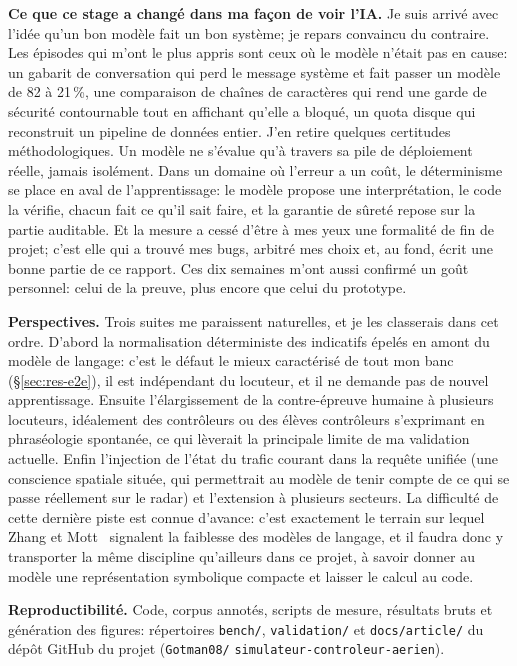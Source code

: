 \documentclass[11pt,a4paper]{article}
\begin{document}
\medskip
\noindent\textbf{Ce que ce stage a changé dans ma façon de voir l'IA.} Je suis arrivé avec l'idée qu'un bon modèle fait un bon système; je repars convaincu du contraire. Les épisodes qui m'ont le plus appris sont ceux où le modèle n'était pas en cause: un gabarit de conversation qui perd le message système et fait passer un modèle de 82 à 21\,\%, une comparaison de chaînes de caractères qui rend une garde de sécurité contournable tout en affichant qu'elle a bloqué, un quota disque qui reconstruit un pipeline de données entier. J'en retire quelques certitudes méthodologiques. Un modèle ne s'évalue qu'à travers sa pile de déploiement réelle, jamais isolément. Dans un domaine où l'erreur a un coût, le déterminisme se place en aval de l'apprentissage: le modèle propose une interprétation, le code la vérifie, chacun fait ce qu'il sait faire, et la garantie de sûreté repose sur la partie auditable. Et la mesure a cessé d'être à mes yeux une formalité de fin de projet; c'est elle qui a trouvé mes bugs, arbitré mes choix et, au fond, écrit une bonne partie de ce rapport. Ces dix semaines m'ont aussi confirmé un goût personnel: celui de la preuve, plus encore que celui du prototype.

\medskip
\noindent\textbf{Perspectives.} Trois suites me paraissent naturelles, et je les classerais dans cet ordre. D'abord la normalisation déterministe des indicatifs épelés en amont du modèle de langage: c'est le défaut le mieux caractérisé de tout mon banc (\S\ref{sec:res-e2e}), il est indépendant du locuteur, et il ne demande pas de nouvel apprentissage. Ensuite l'élargissement de la contre-épreuve humaine à plusieurs locuteurs, idéalement des contrôleurs ou des élèves contrôleurs s'exprimant en phraséologie spontanée, ce qui lèverait la principale limite de ma validation actuelle. Enfin l'injection de l'état du trafic courant dans la requête unifiée (une conscience spatiale située, qui permettrait au modèle de tenir compte de ce qui se passe réellement sur le radar) et l'extension à plusieurs secteurs. La difficulté de cette dernière piste est connue d'avance: c'est exactement le terrain sur lequel Zhang et Mott~\cite{zhang} signalent la faiblesse des modèles de langage, et il faudra donc y transporter la même discipline qu'ailleurs dans ce projet, à savoir donner au modèle une représentation symbolique compacte et laisser le calcul au code. 

\medskip
\noindent\textbf{Reproductibilité.} Code, corpus annotés, scripts de mesure, résultats
bruts et génération des figures: répertoires \texttt{bench/}, \texttt{validation/} et
\texttt{docs/article/} du dépôt GitHub du projet
(\texttt{Gotman08/} \texttt{simulateur-controleur-aerien}).
\end{document}
